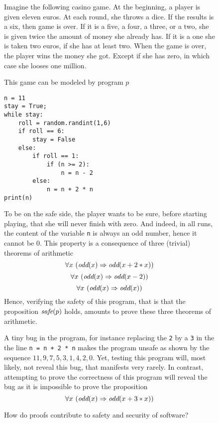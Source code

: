 \begin{figure}
\begin{framed}
Imagine the following casino game. At the beginning, a player is given
eleven euros. At each round, she throws a dice. If the results is a
six, then game is over.  If it is a five, a four, a three, or a two,
she is given twice the amount of money she already has. If it is a one
she is taken two euros, if she has at least two.  When the game is
over, the player wins the money she got. Except if she has zero, in
which case she looses one million.

This game can be modeled by program $p$
\begin{verbatim}
n = 11
stay = True;
while stay: 
    roll = random.randint(1,6)
    if roll == 6:
        stay = False
    else:
        if roll == 1:
            if (n >= 2):
                n = n - 2
        else:
            n = n + 2 * n
print(n)
\end{verbatim}

To be on the safe side, the player wants to be sure, before starting
playing, that she will never finish with zero.  And indeed, in all runs,
the content of the variable {\tt n} is always an odd number, hence it
cannot be $0$. This property is a consequence of three (trivial)
theorems of arithmetic
$$\forall x~(\mbox{\it odd}(x) \Rightarrow \mbox{\it odd}(x + 2 * x))$$
$$\forall x~(\mbox{\it odd}(x) \Rightarrow \mbox{\it odd}(x - 2))$$
$$\forall x~(\mbox{\it odd}(x) \Rightarrow \mbox{\it odd}(x))$$
Hence, verifying the safety of this program, that is that the
proposition 
${\mbox{\it safe}}(p)$ holds, 
amounts to prove these three theorems of arithmetic.

A tiny bug in the program, for instance replacing the {\tt 2} by a
{\tt 3} in the the line {\tt n = n + 2 * n} makes the program unsafe
as shown by the sequence $11, 9, 7, 5, 3, 1, 4, 2, 0$. Yet, testing
this program will, most likely, not reveal this bug, that manifests
very rarely.  In contrast, attempting to prove the correctness of this
program will
reveal the bug as it is impossible to prove the proposition
$$\forall x~(\mbox{\it odd}(x) \Rightarrow \mbox{\it odd}(x + 3 * x))$$
\caption{How do proofs contribute to safety and security of software?\label{safety}}
\end{framed}
\end{figure}

